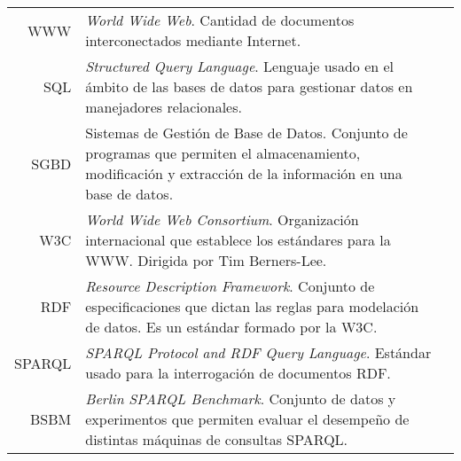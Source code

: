 \begin{tabular}{r p{13cm}l }
    WWW & \emph{World Wide Web}. Cantidad de documentos interconectados mediante Internet.\\

    SQL & \emph{Structured Query Language}. Lenguaje usado en el ámbito de las bases de datos para gestionar datos en manejadores relacionales.\\

    SGBD & Sistemas de Gestión de Base de Datos. Conjunto de programas que permiten el almacenamiento, modificación y extracción de la información en una base de datos.\\

    W3C & \emph{World Wide Web Consortium}. Organización internacional que establece los estándares para la WWW. Dirigida por Tim Berners-Lee.\\

    RDF & \emph{Resource Description Framework}. Conjunto de especificaciones que dictan las reglas para modelación de datos. Es un estándar formado por la W3C.\\

    SPARQL & \emph{SPARQL Protocol and RDF Query Language}. Estándar usado para la interrogación de documentos RDF.\\
    
    BSBM & \emph{Berlin SPARQL Benchmark}. Conjunto de datos y experimentos que permiten evaluar el desempeño de distintas máquinas de consultas SPARQL.\\
\end{tabular}